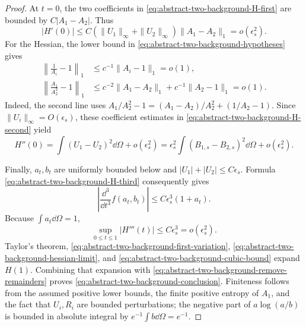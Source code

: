 \begin{proof}
At \(t=0\), the two coefficients in \eqref{eq:abstract-two-background-H-first}
are bounded by \(C|A_1-A_2|\).  Thus
\begin{equation}\label{eq:abstract-two-background-first-variation}
 |H'(0)|\le
 C(\|U_1\|_\infty+\|U_2\|_\infty)\|A_1-A_2\|_1
 =o(\epsilon_s^2).
\end{equation}
For the Hessian, the lower bound in
\eqref{eq:abstract-two-background-hypotheses} gives
\begin{align}
 \left\|\frac1{A_i}-1\right\|_1
 &\le c^{-1}\|A_i-1\|_1=o(1),
 \label{eq:abstract-two-background-inverse-coefficient}\\
 \left\|\frac{A_1}{A_2^2}-1\right\|_1
 &\le c^{-2}\|A_1-A_2\|_1
      +c^{-1}\|A_2-1\|_1=o(1).
 \label{eq:abstract-two-background-third-coefficient}
\end{align}
Indeed, the second line uses
\(A_1/A_2^2-1=(A_1-A_2)/A_2^2+(1/A_2-1)\).
Since \(\|U_i\|_\infty=O(\epsilon_s)\), these coefficient estimates in
\eqref{eq:abstract-two-background-H-second} yield
\begin{equation}\label{eq:abstract-two-background-hessian-limit}
 H''(0)=\int(U_1-U_2)^2\dd\Omega+o(\epsilon_s^2)
 =\epsilon_s^2\int(B_{1,s}-B_{2,s})^2\dd\Omega
  +o(\epsilon_s^2).
\end{equation}

Finally, \(a_t,b_t\) are uniformly bounded below and
\(|U_1|+|U_2|\le C\epsilon_s\).  Formula
\eqref{eq:abstract-two-background-H-third} consequently gives
\[
 \left|\frac{\dd^3}{\dd t^3}f(a_t,b_t)\right|
 \le C\epsilon_s^3(1+a_t).
\]
Because \(\int a_t\dd\Omega=1\),
\begin{equation}\label{eq:abstract-two-background-cubic-bound}
 \sup_{0\le t\le1}|H'''(t)|\le C\epsilon_s^3
 =o(\epsilon_s^2).
\end{equation}
Taylor's theorem, \eqref{eq:abstract-two-background-first-variation},
\eqref{eq:abstract-two-background-hessian-limit}, and
\eqref{eq:abstract-two-background-cubic-bound} expand \(H(1)\).  Combining
that expansion with
\eqref{eq:abstract-two-background-remove-remainders} proves
\eqref{eq:abstract-two-background-conclusion}.  Finiteness follows from the
assumed positive lower bounds, the finite positive entropy of \(A_1\), and
the fact that \(U_i,R_i\) are bounded perturbations; the negative part of
\(a\log(a/b)\) is bounded in absolute integral by
\(e^{-1}\int b\dd\Omega=e^{-1}\).
\end{proof}

